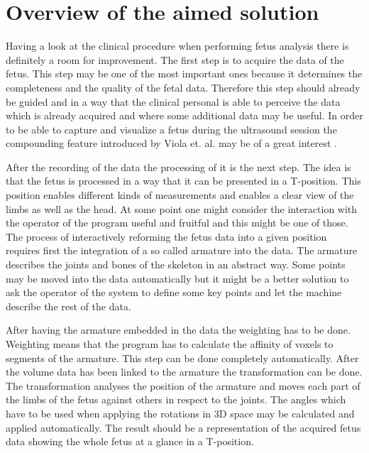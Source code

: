 \section{Overview of the aimed solution}
Having a look at the clinical procedure when performing fetus analysis there is definitely a room for improvement. The first step is to acquire the data of the fetus. This step may be one of the most important ones because it determines the completeness and the quality of the fetal data. Therefore this step should already be guided and in a way that the clinical personal is able to perceive the data which is already acquired and where some additional data may be useful. In order to be able to capture and visualize a fetus during the ultrasound session the compounding feature introduced by Viola et. al. may be of a great interest \cite{Viola2013}.\newline

After the recording of the data the processing of it is the next step. The idea is that the fetus is processed in a way that it can be presented in a T-position. This position enables different kinds of measurements and enables a clear view of the limbs as well as the head. At some point one might consider the interaction with the operator of the program useful and fruitful and this might be one of those. The process of interactively reforming the fetus data into a given position requires first the integration of a so called armature into the data. The armature describes the joints and bones of the skeleton in an abstract way. Some points may be moved into the data automatically but it might be a better solution to ask the operator of the system to define some key points and let the machine describe the rest of the data.\newline

After having the armature embedded in the data the weighting has to be done. Weighting means that the program has to calculate the affinity of voxels to segments of the armature. This step can be done completely automatically. After the volume data has been linked to the armature the transformation can be done. The transformation analyses the position of the armature and moves each part of the limbs of the fetus against others in respect to the joints. The angles which have to be used when applying the rotations in 3D space may be calculated and applied automatically. The result should be a representation of the acquired fetus data showing the whole fetus at a glance in a T-position.\newline

